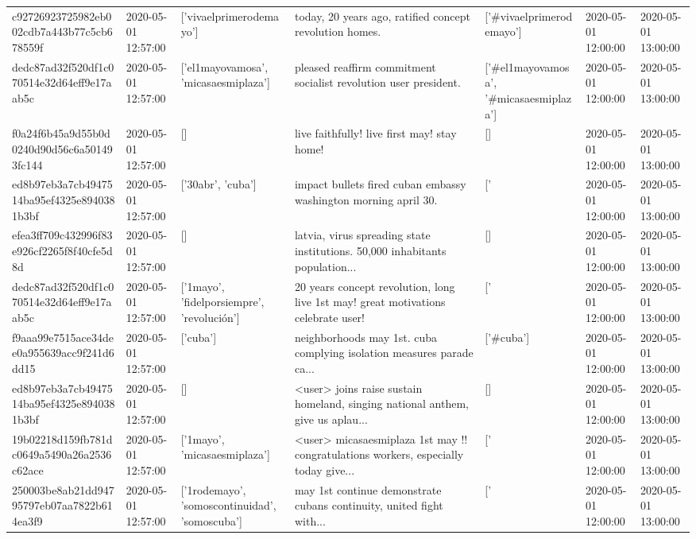 \begin{tabular}{lllllll}
c92726923725982eb002cdb7a443b77c5cb678559f & 2020-05-01 12:57:00 & ['vivaelprimerodemayo'] & today, 20 years ago, ratified concept revolution homes. & ['#vivaelprimerodemayo'] & 2020-05-01 12:00:00 & 2020-05-01 13:00:00 \\
dedc87ad32f520df1c070514e32d64eff9e17aab5c & 2020-05-01 12:57:00 & ['el1mayovamosa', 'micasaesmiplaza'] & pleased reaffirm commitment socialist revolution user president. & ['#el1mayovamosa', '#micasaesmiplaza'] & 2020-05-01 12:00:00 & 2020-05-01 13:00:00 \\
f0a24f6b45a9d55b0d0240d90d56c6a501493fc144 & 2020-05-01 12:57:00 & [] & live faithfully! live first may! stay home! & [] & 2020-05-01 12:00:00 & 2020-05-01 13:00:00 \\
ed8b97eb3a7cb4947514ba95ef4325e8940381b3bf & 2020-05-01 12:57:00 & ['30abr', 'cuba'] & impact bullets fired cuban embassy washington morning april 30. & ['#30abr', '#cuba'] & 2020-05-01 12:00:00 & 2020-05-01 13:00:00 \\
efea3ff709c432996f83e926cf2265f8f40cfe5d8d & 2020-05-01 12:57:00 & [] & latvia, virus spreading state institutions. 50,000 inhabitants population... & [] & 2020-05-01 12:00:00 & 2020-05-01 13:00:00 \\
dedc87ad32f520df1c070514e32d64eff9e17aab5c & 2020-05-01 12:57:00 & ['1mayo', 'fidelporsiempre', 'revolución'] & 20 years concept revolution, long live 1st may! great motivations celebrate user! & ['#1mayo', '#fidelporsiempre', '#revolución'] & 2020-05-01 12:00:00 & 2020-05-01 13:00:00 \\
f9aaa99e7515ace34dee0a955639acc9f241d6dd15 & 2020-05-01 12:57:00 & ['cuba'] & neighborhoods may 1st. cuba complying isolation measures parade ca... & ['#cuba'] & 2020-05-01 12:00:00 & 2020-05-01 13:00:00 \\
ed8b97eb3a7cb4947514ba95ef4325e8940381b3bf & 2020-05-01 12:57:00 & [] & <user> joins raise sustain homeland, singing national anthem, give us aplau... & [] & 2020-05-01 12:00:00 & 2020-05-01 13:00:00 \\
19b02218d159fb781dc0649a5490a26a2536c62ace & 2020-05-01 12:57:00 & ['1mayo', 'micasaesmiplaza'] & <user> micasaesmiplaza 1st may !!️ congratulations workers, especially today give... & ['#1mayo', '#micasaesmiplaza'] & 2020-05-01 12:00:00 & 2020-05-01 13:00:00 \\
250003be8ab21dd94795797eb07aa7822b614ea3f9 & 2020-05-01 12:57:00 & ['1rodemayo', 'somoscontinuidad', 'somoscuba'] & may 1st continue demonstrate cubans continuity, united fight with... & ['#1rodemayo', '#somoscontinuidad', '#somoscuba'] & 2020-05-01 12:00:00 & 2020-05-01 13:00:00 \\

\end{tabular}
